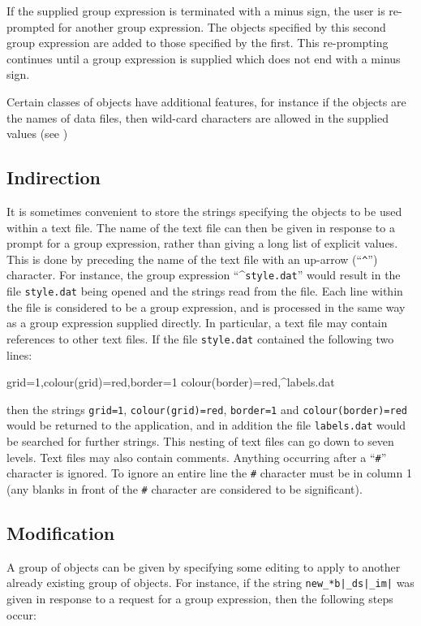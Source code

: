 \documentclass[twoside,11pt]{starlink}
\begin{document}
If the supplied group expression is terminated with a minus
sign, the user is re-prompted for another group expression. The
objects specified by this second group expression are added to
those specified by the first. This re-prompting continues until
a group expression is supplied which does not end with a minus
sign.

Certain classes of objects have additional features, for
instance if the objects are the names of data files, then wild-card characters
are allowed in the supplied values (see )

\subsection{\label{SEC:IND}Indirection}
It is sometimes convenient to store the strings specifying the objects to
be used within a text file. The name of the text file can then be given
in response to a prompt for a group expression, rather than giving a long
list of explicit values. This is done by preceding the name of the text
file with an up-arrow (``\verb+^+'') character. For instance, the group
expression ``\^{}\verb+style.dat+'' would result in the file
\verb+style.dat+ being opened and the strings read from the file. Each
line within the file is considered to be a group expression, and is
processed in the same way as a group expression supplied directly. In
particular, a text file may contain references to other text files. If
the file
\verb+style.dat+ contained the following two lines:

\begin{terminalv}
grid=1,colour(grid)=red,border=1
colour(border)=red,^labels.dat
\end{terminalv}

then the strings \verb+grid=1+, \verb+colour(grid)=red+, \verb+border=1+
and \verb+colour(border)=red+ would be returned to the
application, and in addition the file \verb+labels.dat+ would be
searched for further strings. This nesting of text files can go
down to seven levels. Text files may also contain comments.
Anything occurring after a ``\verb+#+'' character is ignored. To ignore
an entire line the \verb+#+ character must be in column 1 (any blanks in
front of the \verb+#+ character are considered to be significant).

\subsection{\label{SEC:MOD}Modification}
A group of objects can be given by specifying some editing to
apply to another already existing group of objects. For instance,
if the string \verb+new_*b|_ds|_im|+ was given in response to a request
for a group expression, then the following steps occur:
\end{document}
